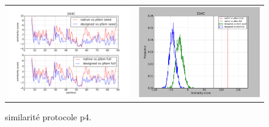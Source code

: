 \documentclass[a4paper,12pt]{article}
\begin{document}
\begin{figure}[t]
\begin{tabular}{cc}
       \includegraphics[width=8.45cm]{gen_08032012/1O4C/p4/graph_simil_bypos.png} &
       \includegraphics[width=8.45cm]{gen_08032012/1O4C/p4/graph_simil_byseq.png} \\

     \end{tabular}

     \caption{similarité protocole p4.}
   \end{figure}
\end{document}
